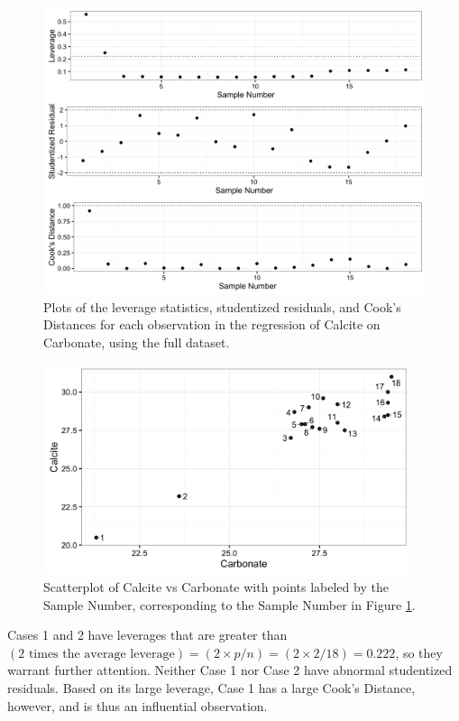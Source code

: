 \documentclass[11pt]{exam} %
\begin{document}
\begin{questions}
\begin{parts}
\begin{figure}[!h]
	\centering
	\captionsetup{width=0.8\textwidth}
	\includegraphics[width=5.5in]{6c.png}
	\caption{Plots of the leverage statistics, studentized residuals, and Cook's Distances for each observation in the regression of Calcite on Carbonate, using the full dataset.}
	\label{fig:6c}
\end{figure}

\begin{figure}[!h]
	\centering
	\captionsetup{width=0.8\textwidth}
	\includegraphics[width=4.25in]{6c_scatter.png}
	\caption{Scatterplot of Calcite vs Carbonate with points labeled by the Sample Number, corresponding to the Sample Number in Figure \ref{fig:6c}.}
	\label{fig:6c_scatter}
\end{figure}

Cases 1 and 2 have leverages that are greater than $(\text{2 times the average leverage}) = (2 \times p/n) = (2 \times 2/18) = 0.222$, so they warrant further attention. Neither Case 1 nor Case 2 have abnormal studentized residuals. Based on its large leverage, Case 1 has a large Cook's Distance, however, and is thus an influential observation.


\end{parts}
\end{questions}
\end{document}
